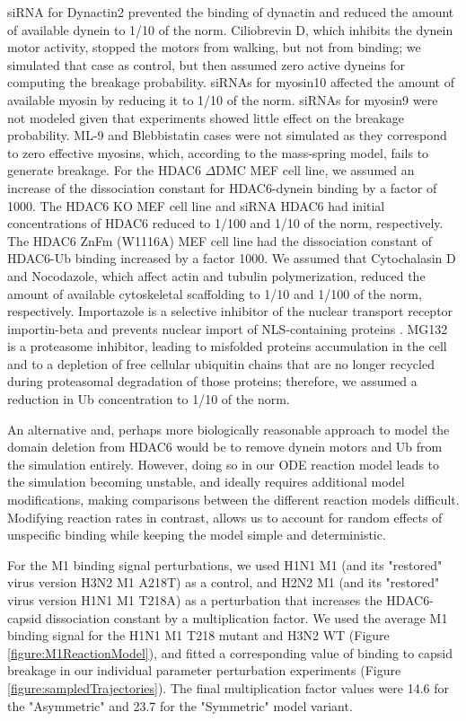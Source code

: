 siRNA for Dynactin2 prevented the binding of dynactin and reduced the amount of available dynein to 1/10 of the norm. Ciliobrevin D, which inhibits the dynein motor activity, stopped the motors from walking, but not from binding; we simulated that case as control, but then assumed zero active dyneins for computing the breakage probability. siRNAs for myosin10 affected the amount of available myosin by reducing it to 1/10 of the norm. siRNAs for myosin9 were not modeled given that experiments showed little effect on the breakage probability. ML-9 and Blebbistatin cases were not simulated as they correspond to zero effective myosins, which, according to the mass-spring model, fails to generate breakage. For the HDAC6 $\Delta$DMC MEF cell line, we assumed an increase of the dissociation constant for HDAC6-dynein binding by a factor of 1000. The HDAC6 KO MEF cell line and siRNA HDAC6 had initial concentrations of HDAC6 reduced to 1/100 and 1/10 of the norm, respectively. The HDAC6 ZnFm (W1116A) MEF cell line had the dissociation constant of HDAC6-Ub binding increased by a factor 1000. We assumed that Cytochalasin D and Nocodazole, which affect actin and tubulin polymerization, reduced the amount of available cytoskeletal scaffolding to 1/10 and 1/100 of the norm, respectively. Importazole is a selective inhibitor of the nuclear transport receptor importin-beta and prevents nuclear import of NLS-containing proteins \cite{soderholm2011importazole}. MG132 is a proteasome inhibitor, leading to misfolded proteins accumulation in the cell and to a depletion of free cellular ubiquitin chains that are no longer recycled during proteasomal degradation of those proteins; therefore, we assumed a reduction in Ub concentration to 1/10 of the norm.

An alternative and, perhaps more biologically reasonable approach to model the domain deletion from HDAC6 would be to remove dynein motors and Ub from the simulation entirely. However, doing so in our ODE reaction model leads to the simulation becoming unstable, and ideally requires additional model modifications, making comparisons between the different reaction models difficult. Modifying reaction rates in contrast, allows us to account for random effects of unspecific binding while keeping the model simple and deterministic.

For the M1 binding signal perturbations, we used H1N1 M1 (and its "restored" virus version H3N2 M1 A218T) as a control, and H2N2 M1 (and its "restored" virus version H1N1 M1 T218A) as a perturbation that increases the HDAC6-capsid dissociation constant by a multiplication factor. We used the average M1 binding signal for the H1N1 M1 T218 mutant and H3N2 WT (Figure \ref{figure:M1ReactionModel}), and fitted a corresponding value of binding to capsid breakage in our individual parameter perturbation experiments (Figure \ref{figure:sampledTrajectories}). The final multiplication factor values were 14.6 for the "Asymmetric" and 23.7 for the "Symmetric" model variant.


